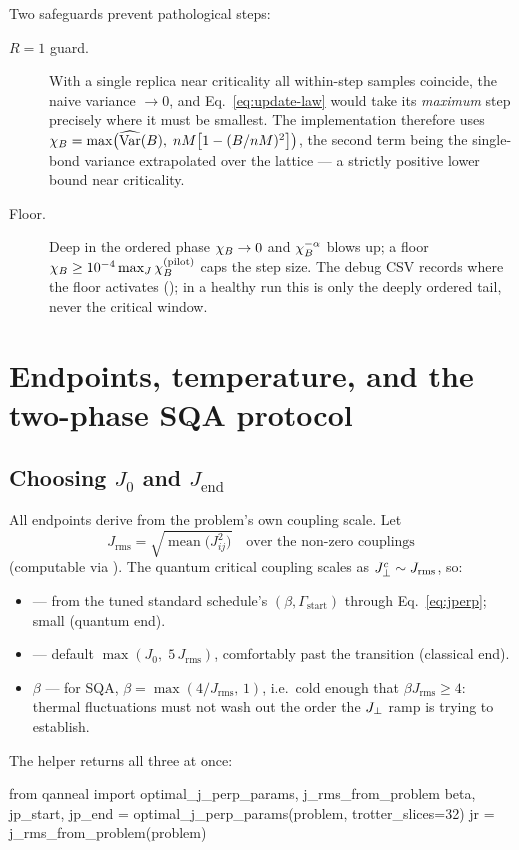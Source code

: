 Two safeguards prevent pathological steps:
\begin{description}
\item[$R=1$ guard.] With a single replica near criticality all within-step
samples coincide, the naive variance $\to0$, and
Eq.~\eqref{eq:update-law} would take its \emph{maximum} step precisely where
it must be smallest. The implementation therefore uses
$\chi_B=\max\bigl(\widehat{\operatorname{Var}}(B),\;
nM\bigl[1-(B/nM)^2\bigr]\bigr)$, the second term being the
single-bond variance extrapolated over the lattice --- a strictly positive
lower bound near criticality.
\item[Floor.] Deep in the ordered phase $\chi_B\to0$ and
$\chi_B^{-\alpha}$ blows up; a floor
$\chi_B\ge10^{-4}\max_J\chi_B^{\text{(pilot)}}$ caps the step size. The debug
CSV records where the floor activates (); in a healthy run
this is only the deeply ordered tail, never the critical window.
\end{description}

\section{Endpoints, temperature, and the two-phase SQA protocol}
\label{sec:optimal-params}

\subsection{Choosing $J_0$ and $J_{\mathrm{end}}$}

All endpoints derive from the problem's own coupling scale. Let
\begin{equation}
J_{\mathrm{rms}}=\sqrt{\operatorname{mean}\bigl(J_{ij}^2\bigr)}
\quad\text{over the non-zero couplings}
\end{equation}
(computable via ). The quantum critical
coupling scales as $J_{\perp}^{c}\sim J_{\mathrm{rms}}$, so:
\begin{itemize}
\item {} --- from the tuned standard schedule's
$(\beta,\Gamma_{\text{start}})$ through Eq.~\eqref{eq:jperp}; small
(quantum end).
\item {} --- default $\max(J_0,\;5\,J_{\mathrm{rms}})$,
comfortably past the transition (classical end).
\item $\beta$ --- for SQA, $\beta=\max(4/J_{\mathrm{rms}},\,1)$, i.e.\ cold
enough that $\beta J_{\mathrm{rms}}\geq4$: thermal fluctuations must not
wash out the order the $J_{\perp}$ ramp is trying to establish.
\end{itemize}
The helper returns all three at once:
\begin{pycode}
from qanneal import optimal_j_perp_params, j_rms_from_problem
beta, jp_start, jp_end = optimal_j_perp_params(problem, trotter_slices=32)
jr = j_rms_from_problem(problem)
\end{pycode}

